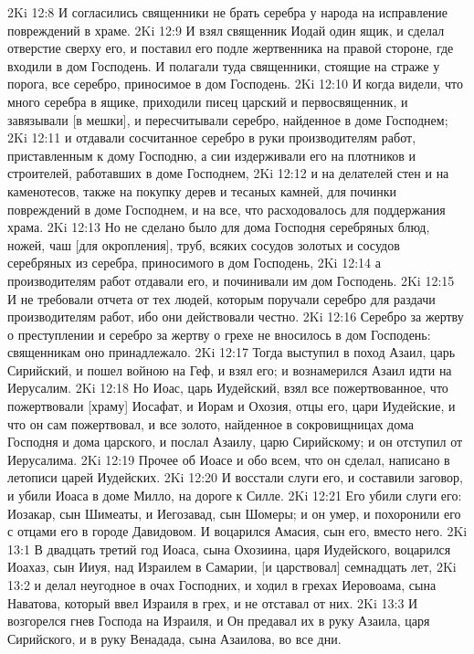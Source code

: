 2Ki 12:8  И согласились священники не брать серебра у народа на исправление повреждений в храме.
2Ki 12:9  И взял священник Иодай один ящик, и сделал отверстие сверху его, и поставил его подле жертвенника на правой стороне, где входили в дом Господень. И полагали туда священники, стоящие на страже у порога, все серебро, приносимое в дом Господень.
2Ki 12:10  И когда видели, что много серебра в ящике, приходили писец царский и первосвященник, и завязывали [в мешки], и пересчитывали серебро, найденное в доме Господнем;
2Ki 12:11  и отдавали сосчитанное серебро в руки производителям работ, приставленным к дому Господню, а сии издерживали его на плотников и строителей, работавших в доме Господнем,
2Ki 12:12  и на делателей стен и на каменотесов, также на покупку дерев и тесаных камней, для починки повреждений в доме Господнем, и на все, что расходовалось для поддержания храма.
2Ki 12:13  Но не сделано было для дома Господня серебряных блюд, ножей, чаш [для окропления], труб, всяких сосудов золотых и сосудов серебряных из серебра, приносимого в дом Господень,
2Ki 12:14  а производителям работ отдавали его, и починивали им дом Господень.
2Ki 12:15  И не требовали отчета от тех людей, которым поручали серебро для раздачи производителям работ, ибо они действовали честно.
2Ki 12:16  Серебро за жертву о преступлении и серебро за жертву о грехе не вносилось в дом Господень: священникам оно принадлежало.
2Ki 12:17  Тогда выступил в поход Азаил, царь Сирийский, и пошел войною на Геф, и взял его; и вознамерился Азаил идти на Иерусалим.
2Ki 12:18  Но Иоас, царь Иудейский, взял все пожертвованное, что пожертвовали [храму] Иосафат, и Иорам и Охозия, отцы его, цари Иудейские, и что он сам пожертвовал, и все золото, найденное в сокровищницах дома Господня и дома царского, и послал Азаилу, царю Сирийскому; и он отступил от Иерусалима.
2Ki 12:19  Прочее об Иоасе и обо всем, что он сделал, написано в летописи царей Иудейских.
2Ki 12:20  И восстали слуги его, и составили заговор, и убили Иоаса в доме Милло, на дороге к Силле.
2Ki 12:21  Его убили слуги его: Иозакар, сын Шимеаты, и Иегозавад, сын Шомеры; и он умер, и похоронили его с отцами его в городе Давидовом. И воцарился Амасия, сын его, вместо него.
2Ki 13:1  В двадцать третий год Иоаса, сына Охозиина, царя Иудейского, воцарился Иоахаз, сын Ииуя, над Израилем в Самарии, [и царствовал] семнадцать лет,
2Ki 13:2  и делал неугодное в очах Господних, и ходил в грехах Иеровоама, сына Наватова, который ввел Израиля в грех, и не отставал от них.
2Ki 13:3  И возгорелся гнев Господа на Израиля, и Он предавал их в руку Азаила, царя Сирийского, и в руку Венадада, сына Азаилова, во все дни.
